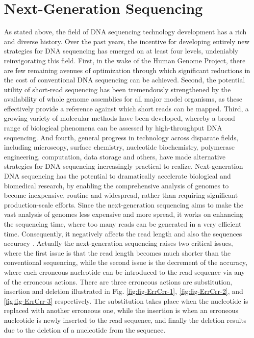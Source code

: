 \documentclass[12pt,openany]{llncs}
\begin{document}
\newpage
\section{Next-Generation Sequencing}
As stated above, the field of DNA sequencing technology development has a rich and diverse history. Over the past years, the incentive for developing entirely new strategies for DNA sequencing has emerged on at least four levels, undeniably reinvigorating this field\cite{NGS,NGS1}. First, in the wake of the Human Genome Project, there are few remaining avenues of optimization through which significant reductions in the cost of conventional DNA sequencing can be achieved. Second, the potential utility of short-read sequencing has been tremendously strengthened by the availability of whole genome assemblies for all major model organisms, as these effectively provide a reference against which short reads can be mapped. Third, a growing variety of molecular methods have been developed, whereby a broad range of biological phenomena can be assessed by high-throughput DNA sequencing. And fourth, general progress in technology across disparate fields, including microscopy, surface chemistry, nucleotide biochemistry, polymerase engineering, computation, data storage and others, have made alternative strategies for DNA sequencing increasingly practical to realize. Next-generation DNA sequencing has the potential to dramatically accelerate biological and biomedical research, by enabling the comprehensive analysis of genomes to become inexpensive, routine and widespread, rather than requiring significant production-scale efforts. Since the next-generation sequencing aims to make the vast analysis of genomes less expensive and more spread, it works on enhancing the sequencing time, where too many reads can be generated in a very efficient time. Consequently, it negatively affects the read length and also the sequences accuracy \cite{NGS2}. Actually the next-generation sequencing raises two critical issues, where the first issue is that the read length becomes much shorter than the conventional sequencing, while the second issue is the decrement of the accuracy, where each erroneous nucleotide can be introduced to the read sequence via any of the erroneous actions. There are three erroneous actions are substitution, insertion and deletion illustrated in Fig. \ref{fig:fig-ErrCrr-1}, \ref{fig:fig-ErrCrr-2}, and \ref{fig:fig-ErrCrr-3} respectively. The substitution takes place when the nucleotide is replaced with another erroneous one, while the insertion is when an erroneous nucleotide is newly inserted to the read sequence, and finally the deletion results due to the deletion of a nucleotide from the sequence.
\end{document}
